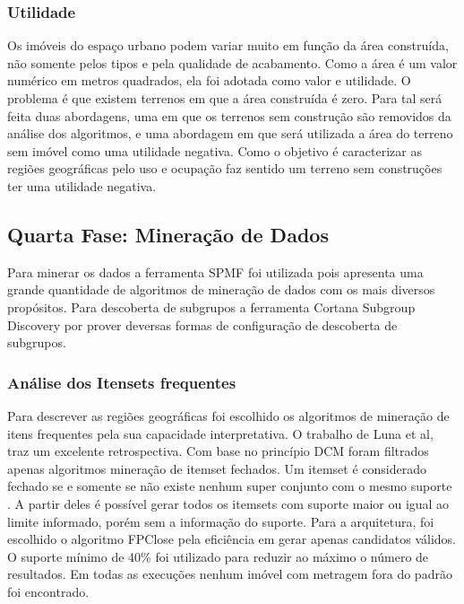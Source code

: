 \documentclass[12pt]{article}
\begin{document}
 \subsubsection{Utilidade}
 Os imóveis do espaço urbano podem variar muito em função da área construída, não somente pelos tipos e pela qualidade de acabamento. Como a área é um valor numérico em metros quadrados, ela foi adotada como valor e utilidade. O problema é que existem terrenos em que a área construída é zero. Para tal será feita duas abordagens, uma em que os terrenos sem construção são removidos da análise dos algoritmos, e uma abordagem em que será utilizada a área do terreno sem imóvel como uma utilidade negativa. Como o objetivo é caracterizar as regiões geográficas pelo uso e ocupação faz sentido um terreno sem construções ter uma utilidade negativa.

 \subsection{Quarta Fase: Mineração de Dados}
 Para minerar os dados a ferramenta SPMF \cite{SPMF} foi utilizada pois apresenta uma grande quantidade de algoritmos de mineração de dados com os mais diversos propósitos. Para descoberta de subgrupos a ferramenta Cortana Subgroup Discovery \cite{meeng2011flexible} por prover deversas formas de configuração de descoberta de subgrupos.
 \subsubsection{Análise dos Itensets frequentes}
 Para descrever as regiões geográficas foi escolhido os algoritmos de mineração de itens frequentes pela sua capacidade interpretativa. O trabalho de Luna et al\cite{luna2019frequent}, traz um excelente retrospectiva. Com base no princípio DCM foram filtrados apenas algoritmos mineração de itemset fechados. Um itemset é considerado fechado se e somente se não existe nenhum super conjunto com o mesmo suporte \cite{lucchese2004mining}. A partir deles é possível gerar todos os itemsets com suporte maior ou igual ao limite informado, porém sem a informação do suporte. Para a arquitetura, foi escolhido o algoritmo FPClose \cite{grahne2005fast} pela eficiência em gerar apenas candidatos válidos. O suporte mínimo de 40\% foi utilizado para reduzir ao máximo o número de resultados. Em todas as execuções nenhum imóvel com metragem fora do padrão foi encontrado.
\end{document}
